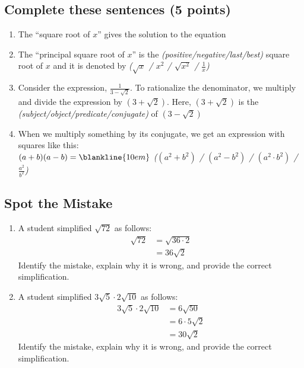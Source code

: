 \documentclass{hw}
\begin{document}
\subsection*{\normalsize Complete these sentences (5 points)}
\begin{enumerate}[label=\alph*.]
    \item The ``square root of $x$'' gives the solution to the equation \blankline{6em}
    \item The ``principal square root of $x$'' is the \blankline{6em} \textit{(positive/negative/last/best)} square root of $x$
        and it is denoted by \blankline{6em} \textit{($\sqrt{x}$ / $x^2$ / $\sqrt{x^2}$ / $\frac{1}{x}$)}
    \item Consider the expression, $\frac{1}{3-\sqrt{2}}$. To rationalize the denominator, we multiply and divide the expression by
        $(3+\sqrt{2})$. Here, $(3+\sqrt{2})$ is the \blankline{8em} \textit{(subject/object/predicate/conjugate)} of $(3-\sqrt{2})$
    \item When we multiply something by its conjugate, we get an expression with squares like this:\\
        $(a+b)(a-b) = \blankline{10em}$ \textit{($(a^2+b^2)$ / $(a^2 - b^2)$ / $(a^2 \cdot b^2)$ / $\frac{a^2}{b^2}$)}
\end{enumerate}

\subsection*{\normalsize Spot the Mistake}
\begin{enumerate}[label=\alph*.]
    \item A student simplified $\sqrt{72}$ as follows:
        \begin{align*}
        \sqrt{72} &= \sqrt{36 \cdot 2} \\
                  &= 36\sqrt{2}
        \end{align*}
        Identify the mistake, explain why it is wrong, and provide the correct simplification.
        \studentxlargeworkspace
        
    \item A student simplified $3\sqrt{5} \cdot 2\sqrt{10}$ as follows:
        \begin{align*}
        3\sqrt{5} \cdot 2\sqrt{10} &= 6\sqrt{50} \\
                                   &= 6 \cdot 5\sqrt{2} \\
                                   &= 30\sqrt{2}
        \end{align*}
        Identify the mistake, explain why it is wrong, and provide the correct simplification.
        \studentxlargeworkspace
    
\end{enumerate}



\end{document}
